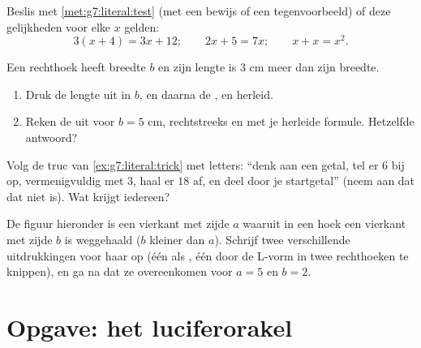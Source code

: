 \begin{exercise}[$\star\star$]\label{exo:g7:literal:8}
Beslis met \cref{met:g7:literal:test} (met een bewijs of een tegenvoorbeeld) of
deze gelijkheden voor elke $x$ gelden:
\[
3(x + 4) = 3x + 12; \qquad
2x + 5 = 7x; \qquad
x + x = x^2 .
\]
\end{exercise}

\begin{exercise}[$\star\star$]\label{exo:g7:literal:9}
Een rechthoek heeft breedte $b$ en zijn lengte is $3$ cm meer dan zijn breedte.
\begin{enumerate}
  \item Druk de lengte uit in $b$, en daarna de , en herleid.
  \item Reken de  uit voor $b = 5$ cm, rechtstreeks en met je herleide
        formule. Hetzelfde antwoord?
\end{enumerate}
\end{exercise}

\begin{exercise}[$\star\star$]\label{exo:g7:literal:10}
Volg de truc van \cref{ex:g7:literal:trick} met letters: ``denk aan een getal, tel
er $6$ bij op, vermenigvuldig met $3$, haal er $18$ af, en deel door je startgetal''
(neem aan dat dat niet  is). Wat krijgt iedereen?
\end{exercise}

\begin{exercise}[$\star\star\star$]\label{exo:g7:literal:11}
De figuur hieronder is een vierkant met zijde $a$ waaruit in een hoek een vierkant
met zijde $b$ is weggehaald ($b$ kleiner dan $a$). Schrijf twee verschillende
uitdrukkingen voor haar  op (één als , één door de L-vorm in
twee rechthoeken te knippen), en ga na dat ze overeenkomen voor $a = 5$ en
$b = 2$.
\end{exercise}

\section{Opgave: het luciferorakel}

